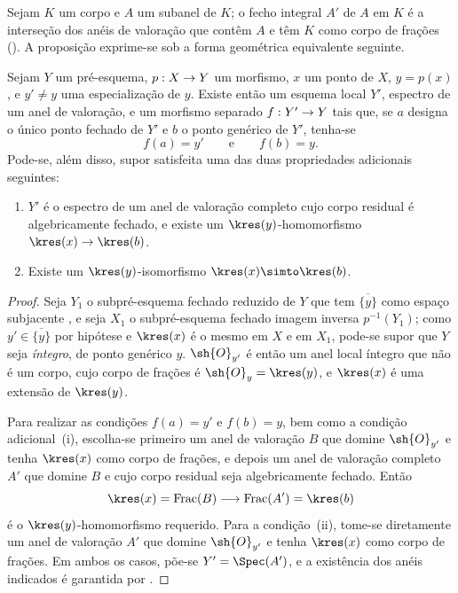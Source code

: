 \documentclass[oneside,10pt]{amsart}
\makeatletter
\newcommand{\ega@arrow}[2]{\mathchoice{#1}{#2}{#2}{#2}}
\renewcommand{\to}{\ega@arrow{\longrightarrow}{\rightarrow}}
\def\Frac{\operatorname{Frac}}
\let\EGAOriginalLabel\label
\renewcommand{\label}[1]{\phantomsection\EGAOriginalLabel{#1}}
\makeatother
\begin{document}
\begin{env}[7.1.3]
\label{II.7.1.3}
Sejam $K$ um corpo e $A$ um subanel de $K$;
o fecho integral $A'$ de $A$ em $K$ é a interseção dos anéis de valoração que contêm $A$ e têm $K$ como corpo de frações (\cite[p.~51, th.~2]{I-11}).
A proposição  exprime-se sob a forma geométrica equivalente seguinte.
\end{env}

\begin{proposition}[7.1.4]
\label{II.7.1.4}
Sejam $Y$ um pré-esquema, $p:X\to Y$ um morfismo, $x$ um ponto de $X$, $y=p(x)$, e $y'\neq y$ uma especialização  de $y$.
Existe então um esquema local $Y'$, espectro de um anel de valoração, e um morfismo separado $f:Y'\to Y$ tais que, se $a$ designa o único ponto fechado de $Y'$ e $b$ o ponto genérico de $Y'$, tenha-se
\[
  f(a)=y'
  \qquad\text{e}\qquad
  f(b)=y.
\]
Pode-se, além disso, supor satisfeita uma das duas propriedades adicionais seguintes:
\begin{enumerate}
  \item[\rm{(i)}] $Y'$ é o espectro de um anel de valoração completo cujo corpo residual é algebricamente fechado, e existe um $\kres(y)$-homomorfismo $\kres(x)\to\kres(b)$.
  \item[\rm{(ii)}] Existe um $\kres(y)$-isomorfismo $\kres(x)\simto\kres(b)$.
\end{enumerate}
\end{proposition}

\begin{proof}
Seja $Y_1$ o subpré-esquema fechado reduzido de $Y$ que tem $\overline{\{y\}}$ como espaço subjacente , e seja $X_1$ o subpré-esquema fechado imagem inversa $p^{-1}(Y_1)$;
como $y'\in\overline{\{y\}}$ por hipótese e $\kres(x)$ é o mesmo em $X$ e em $X_1$, pode-se supor que $Y$ seja \emph{íntegro}, de ponto genérico $y$.
$\sh{O}_{y'}$ é então um anel local íntegro que não é um corpo, cujo corpo de frações é $\sh{O}_y=\kres(y)$, e $\kres(x)$ é uma extensão de $\kres(y)$.

Para realizar as condições $f(a)=y'$ e $f(b)=y$, bem como a condição adicional~(i), escolha-se primeiro um anel de valoração $B$ que domine $\sh{O}_{y'}$ e tenha $\kres(x)$ como corpo de frações, e depois um anel de valoração completo $A'$ que domine $B$ e cujo corpo residual seja algebricamente fechado.
Então
\[
  \kres(x)=\Frac(B)\longrightarrow\Frac(A')=\kres(b)
\]
é o $\kres(y)$-homomorfismo requerido.
Para a condição~(ii), tome-se diretamente um anel de valoração $A'$ que domine $\sh{O}_{y'}$ e tenha $\kres(x)$ como corpo de frações.
Em ambos os casos, põe-se $Y'=\Spec(A')$, e a existência dos anéis indicados é garantida por .
\end{proof}
\end{document}

